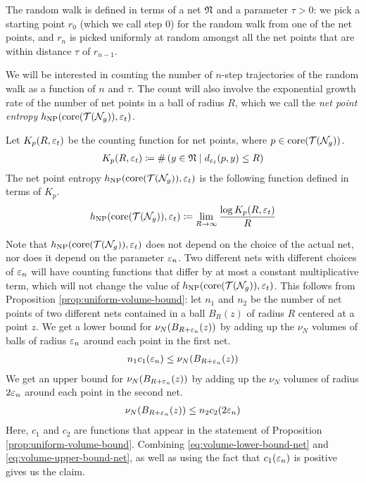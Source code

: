 The random walk is defined in terms of a net $\mathfrak{N}$ and a parameter $\tau > 0$: we pick a starting point $r_0$ (which we call step $0$) for the random walk from one of the net points, and $r_n$ is picked uniformly at random amongst all the net points that are within distance $\tau$ of $r_{n-1}$.

We will be interested in counting the number of $n$-step trajectories of the random walk as a function of $n$ and $\tau$.
The count will also involve the exponential growth rate of the number of net points in a ball of radius $R$, which we call the \emph{net point entropy} $h_{\mathrm{NP}}(\mathrm{core}(\mathcal{T}(\mathcal{N}_g)), \varepsilon_t)$.

\begin{definition}
  Let $K_p(R, \varepsilon_t)$ be the counting function for net points, where $p \in \mathrm{core}(\mathcal{T}(\mathcal{N}_g))$.
  \begin{align*}
    K_p(R, \varepsilon_t) \coloneqq \#\left( y \in \mathfrak{N} \mid d_{\varepsilon_t}(p, y) \leq R \right)
  \end{align*}
  The net point entropy $h_{\mathrm{NP}}(\mathrm{core}(\mathcal{T}(\mathcal{N}_g)), \varepsilon_t)$ is the following function defined in terms of $K_p$.
  \begin{align*}
    h_{\mathrm{NP}}(\mathrm{core}(\mathcal{T}(\mathcal{N}_g)), \varepsilon_t) \coloneqq \lim_{R \to \infty} \frac{\log K_p(R, \varepsilon_t)}{R}
  \end{align*}
\end{definition}

Note that $h_{\mathrm{NP}}(\mathrm{core}(\mathcal{T}(\mathcal{N}_g)), \varepsilon_t)$ does not depend on the choice of the actual net, nor does it depend on the parameter $\varepsilon_n$. Two different nets with different choices of $\varepsilon_n$ will have counting functions that differ by at most a constant multiplicative term, which will not change the value of $h_{\mathrm{NP}}(\mathrm{core}(\mathcal{T}(\mathcal{N}_g)), \varepsilon_t)$.
This follows from Proposition \ref{prop:uniform-volume-bound}: let $n_1$ and $n_2$ be the number of net points of two different nets contained in a ball $B_R(z)$ of radius $R$ centered at a point $z$.
We get a lower bound for $\nu_N(B_{R+\varepsilon_n}(z))$ by adding up the $\nu_N$ volumes of balls of radius $\varepsilon_n$ around each point in the first net.
\begin{align}
  \label{eq:volume-lower-bound-net}
  n_1 c_1(\varepsilon_n) \leq \nu_N(B_{R+\varepsilon_n}(z))
\end{align}
We get an upper bound for $\nu_N(B_{R+\varepsilon_n}(z))$ by adding up the $\nu_N$ volumes of radius $2 \varepsilon_n$ around each point in the second net.
\begin{align}
  \label{eq:volume-upper-bound-net}
   \nu_N(B_{R+\varepsilon_n}(z)) \leq n_2 c_2(2 \varepsilon_n)
\end{align}
Here, $c_1$ and $c_2$ are functions that appear in the statement of Proposition \ref{prop:uniform-volume-bound}.
Combining \eqref{eq:volume-lower-bound-net} and \eqref{eq:volume-upper-bound-net}, as well as using the fact that $c_1(\varepsilon_n)$ is positive gives us the claim.

